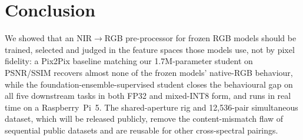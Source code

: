\documentclass[10pt,twocolumn,letterpaper]{article}
\begin{document}
\section{Conclusion}

We showed that an NIR$\rightarrow$RGB pre-processor for frozen RGB models should be trained, selected and judged in the feature spaces those models use, not by pixel fidelity: a Pix2Pix baseline matching our 1.7M-parameter student on PSNR/SSIM recovers almost none of the frozen models' native-RGB behaviour, while the foundation-ensemble-supervised student closes the behavioural gap on all five downstream tasks in both FP32 and mixed-INT8 form, and runs in real time on a Raspberry~Pi~5. The shared-aperture rig and 12{,}536-pair simultaneous dataset, which will be released publicly, remove the content-mismatch flaw of sequential public datasets and are reusable for other cross-spectral pairings.

{\small
\printbibliography
}

\end{document}
